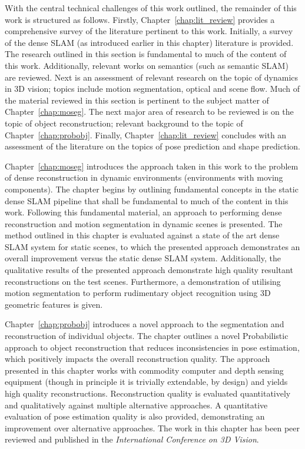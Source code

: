 With the central technical challenges of this work outlined, the remainder of this work is structured 
as follows. Firstly, Chapter~\ref{chap:lit_review} provides a comprehensive survey of the literature 
pertinent to this work. Initially, a survey of the dense SLAM (as introduced earlier in this chapter) 
literature is provided. The research outlined in this section is fundamental to much of the content of 
this work. Additionally, relevant works on semantics (such as semantic SLAM) are reviewed. 
Next is an assessment of relevant research on the topic of dynamics in 3D vision; topics include motion 
segmentation, optical and scene flow. Much of the material reviewed in this section is pertinent to the 
subject matter of Chapter~\ref{chap:moseg}. The next major area of research to be reviewed is on the topic 
of object reconstruction; relevant background to the topic of Chapter~\ref{chap:probobj}. Finally, 
Chapter~\ref{chap:lit_review} concludes with an assessment of the literature on the topics of pose prediction 
and shape prediction.

Chapter~\ref{chap:moseg} introduces the approach taken in this work to the problem of dense reconstruction 
in dynamic environments (environments with moving components). The chapter begins by outlining fundamental 
concepts in the static dense SLAM pipeline that shall be fundamental to much of the content in this work. 
Following this fundamental material, an approach to performing dense reconstruction and motion segmentation 
in dynamic scenes is presented. The method outlined in this chapter is evaluated against a state of the art 
dense SLAM system for static scenes, to which the presented approach demonstrates an overall improvement 
versus the static dense SLAM system. Additionally, the qualitative results of the presented approach 
demonstrate high quality resultant reconstructions on the test scenes. Furthermore, a demonstration of 
utilising motion segmentation to perform rudimentary object recognition using 3D geometric features is 
given.

Chapter~\ref{chap:probobj} introduces a novel approach to the segmentation and reconstruction of individual 
objects. The chapter outlines a novel Probabilistic approach to object reconstruction that reduces 
inconsistencies in pose estimation, which positively impacts the overall reconstruction quality. The 
approach presented in this chapter works with commodity computer and depth sensing equipment (though in 
principle it is trivially extendable, by design) and yields high quality reconstructions. Reconstruction 
quality is evaluated quantitatively and qualitatively against multiple alternative approaches. A 
quantitative evaluation of pose estimation quality is also provided, demonstrating an improvement over 
alternative approaches. The work in this chapter has been peer reviewed and published in the 
\textit{International Conference on 3D Vision}\footnotemark.

